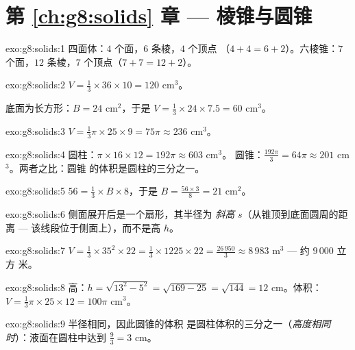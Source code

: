 \section*{第 \ref{ch:g8:solids} 章 --- 棱锥与圆锥}

\begin{solution}{exo:g8:solids:1}
四面体：$4$ 个面，$6$ 条棱，$4$ 个顶点
（$4 + 4 = 6 + 2$）。六棱锥：$7$ 个面，$12$ 条棱，$7$
个顶点（$7 + 7 = 12 + 2$）。
\end{solution}

\begin{solution}{exo:g8:solids:2}
$V = \frac13 \times 36 \times 10 = 120$ cm$^3$。

底面为长方形：$B = 24$ cm$^2$，于是
$V = \frac13 \times 24 \times 7.5 = 60$ cm$^3$。
\end{solution}

\begin{solution}{exo:g8:solids:3}
$V = \frac13 \pi \times 25 \times 9 = 75\pi \approx 236$ cm$^3$。
\end{solution}

\begin{solution}{exo:g8:solids:4}
圆柱：$\pi \times 16 \times 12 = 192\pi \approx 603$ cm$^3$。
圆锥：$\frac{192\pi}{3} = 64\pi \approx 201$ cm$^3$。两者之比：圆锥
的体积是圆柱的三分之一。
\end{solution}

\begin{solution}{exo:g8:solids:5}
$56 = \frac13 \times B \times 8$，于是 $B = \frac{56 \times 3}{8} = 21$
cm$^2$。
\end{solution}

\begin{solution}{exo:g8:solids:6}
侧面展开后是一个扇形，其半径为
\emph{斜高} $s$（从锥顶到底面圆周的距离 ---
该线段位于侧面上），而不是高 $h$。
\end{solution}

\begin{solution}{exo:g8:solids:7}
$V = \frac13 \times 35^2 \times 22 = \frac13 \times 1225 \times 22
= \frac{26\,950}{3} \approx 8\,983$ m$^3$ --- 约 $9\,000$ 立方
米。
\end{solution}

\begin{solution}{exo:g8:solids:8}
高：$h = \sqrt{13^2 - 5^2} = \sqrt{169 - 25} = \sqrt{144} = 12$
cm。体积：$V = \frac13 \pi \times 25 \times 12 = 100\pi$ cm$^3$。
\end{solution}

\begin{solution}{exo:g8:solids:9}
半径相同，因此圆锥的体积
是圆柱体积的三分之一（\emph{高度相同时}）：液面在圆柱中达到
$\frac{9}{3} = 3$ cm。
\end{solution}

